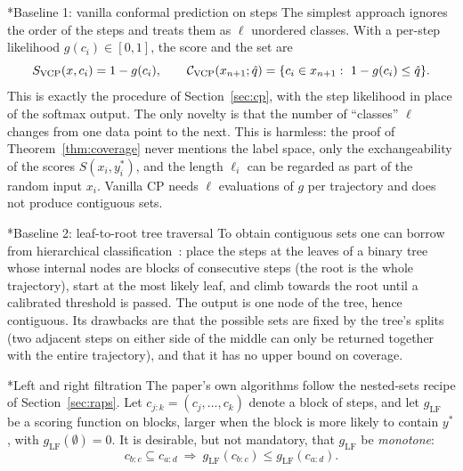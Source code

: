 \documentclass[11pt]{article}
\makeatletter
\theoremstyle{definition}
\renewcommand\subsection{\@startsection{subsection}{2}{\z@}{-3.25ex\@plus -1ex \@minus -.2ex}{1.5ex \@plus .2ex}{\normalfont\large\bfseries\color{secblue}}}
\newcommand{\C}{\mathcal{C}}
\newcommand{\qhat}{\hat{q}}
\newcommand{\LF}{\mathrm{LF}}
\newcommand{\ystar}{y^*}
\makeatother
\begin{document}
\subsection*{Baseline 1: vanilla conformal prediction on steps}
The simplest approach ignores the order of the steps and treats them as $\ell$ unordered classes. With a per-step likelihood $g(c_i)\in[0,1]$, the score and the set are
\[S_{\rm VCP}(x,c_i)=1-g(c_i),\qquad\C_{\rm VCP}(x_{n+1};\qhat)=\{c_i\in x_{n+1}:\ 1-g(c_i)\le\qhat\}.\]
This is exactly the procedure of Section~\ref{sec:cp}, with the step likelihood in place of the softmax output. The only novelty is that the number of ``classes'' $\ell$ changes from one data point to the next. This is harmless: the proof of Theorem~\ref{thm:coverage} never mentions the label space, only the exchangeability of the scores $S(x_i,\ystar_i)$, and the length $\ell_i$ can be regarded as part of the random input $x_i$. Vanilla CP needs $\ell$ evaluations of $g$ per trajectory and does not produce contiguous sets.

\subsection*{Baseline 2: leaf-to-root tree traversal}
To obtain contiguous sets one can borrow from hierarchical classification~\cite{mortier2026}: place the steps at the leaves of a binary tree whose internal nodes are blocks of consecutive steps (the root is the whole trajectory), start at the most likely leaf, and climb towards the root until a calibrated threshold is passed. The output is one node of the tree, hence contiguous. Its drawbacks are that the possible sets are fixed by the tree's splits (two adjacent steps on either side of the middle can only be returned together with the entire trajectory), and that it has no upper bound on coverage.

\subsection*{Left and right filtration}
The paper's own algorithms follow the nested-sets recipe of Section~\ref{sec:raps}. Let $c_{j:k}=(c_j,\dots,c_k)$ denote a block of steps, and let $g_\LF$ be a scoring function on blocks, larger when the block is more likely to contain $\ystar$, with $g_\LF(\emptyset)=0$. It is desirable, but not mandatory, that $g_\LF$ be \emph{monotone}:
\begin{equation}\label{eq:mono}
c_{b:c}\subseteq c_{a:d}\ \Longrightarrow\ g_\LF(c_{b:c})\le g_\LF(c_{a:d}).
\end{equation}
\end{document}
